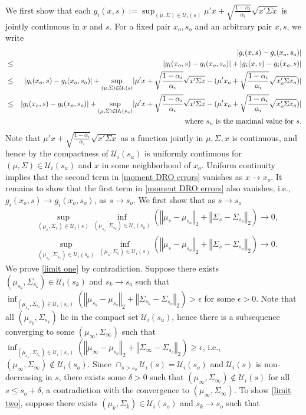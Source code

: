 \documentclass[mnsc,blindrev]{informs4} %
\newcommand{\norm}[1]{\left \Vert #1 \right\Vert}
\begin{document}
We first show that each $g_i(x,s):=\sup_{(\mu,\Sigma)\in \mathcal U_i(s)}\mu'x+\sqrt{\frac{1-\alpha_i}{\alpha_i}}\sqrt{x'\Sigma x}$ is jointly continuous in $x$ and $s$. For a fixed pair $x_o,s_o$ and an arbitrary pair $x,s$, we write
\begin{eqnarray}
\notag&&\lvert g_i(x,s)-g_i(x_o,s_o)\rvert\\
\notag&\leq &\lvert g_i(x_o,s)-g_i(x_o,s_o)\rvert+\lvert g_i(x,s)-g_i(x_o,s)\rvert\\
\notag&\leq&\lvert g_i(x_o,s)-g_i(x_o,s_o)\rvert+\sup_{(\mu,\Sigma)\in \mathcal U_i(s)}\lvert \mu'x+\sqrt{\frac{1-\alpha_i}{\alpha_i}}\sqrt{x'\Sigma x}-(\mu'x_o+\sqrt{\frac{1-\alpha_i}{\alpha_i}}\sqrt{x_o'\Sigma x_o})\rvert\\
\notag&\leq&\lvert g_i(x_o,s)-g_i(x_o,s_o)\rvert+\sup_{(\mu,\Sigma)\in \mathcal U_i(s_u)}\lvert \mu'x+\sqrt{\frac{1-\alpha_i}{\alpha_i}}\sqrt{x'\Sigma x}-(\mu'x_o+\sqrt{\frac{1-\alpha_i}{\alpha_i}}\sqrt{x_o'\Sigma x_o})\rvert\\
&&\text{\ \ where $s_u$ is the maximal value for $s$}.\label{moment DRO errors}
\end{eqnarray}
Note that $\mu'x+\sqrt{\frac{1-\alpha_i}{\alpha_i}}\sqrt{x'\Sigma x}$ as a function jointly in $\mu,\Sigma,x$ is continuous, and hence by the compactness of $\mathcal U_i(s_u)$ is uniformly continuous for $(\mu,\Sigma)\in \mathcal U_i(s_u)$ and $x$ in some neighborhood of $x_o$. Uniform continuity implies that the second term in \eqref{moment DRO errors} vanishes as $x\to x_o$. It remains to show that the first term in \eqref{moment DRO errors} also vanishes, i.e., $g_i(x_o,s) \to g_i(x_o,s_o)$, as $s\to s_o$. We first show that as $s\to s_o$
\begin{align}
&\sup_{(\mu_s,\Sigma_s)\in\mathcal U_i(s)}\inf_{(\mu_{s_o},\Sigma_{s_o})\in\mathcal U_i(s_o)}(\norm{\mu_s-\mu_{s_o}}_2+\norm{\Sigma_s-\Sigma_{s_o}}_2)\to 0,\label{limit one}\\
&\sup_{(\mu_{s_o},\Sigma_{s_o})\in\mathcal U_i(s_o)}\inf_{(\mu_s,\Sigma_s)\in\mathcal U_i(s)}(\norm{\mu_s-\mu_{s_o}}_2+\norm{\Sigma_s-\Sigma_{s_o}}_2)\to 0.\label{limit two}
\end{align}
We prove \eqref{limit one} by contradiction. Suppose there exists $(\mu_{s_k},\Sigma_{s_k})\in\mathcal U_i(s_k)$ and $s_k\to s_o$ such that $\inf_{(\mu_{s_o},\Sigma_{s_o})\in\mathcal U_i(s_o)}(\norm{\mu_{s_k}-\mu_{s_o}}_2+\norm{\Sigma_{s_k}-\Sigma_{s_o}}_2)>\epsilon$ for some $\epsilon>0$. Note that all $(\mu_{s_k},\Sigma_{s_k})$ lie in the compact set $\mathcal U_i(s_u)$, hence there is a subsequence converging to some $(\mu_{\infty},\Sigma_{\infty})$ such that $\inf_{(\mu_{s_o},\Sigma_{s_o})\in\mathcal U_i(s_o)}(\norm{\mu_{\infty}-\mu_{s_o}}_2+\norm{\Sigma_{\infty}-\Sigma_{s_o}}_2)\geq\epsilon$, i.e., $(\mu_{\infty},\Sigma_{\infty})\notin \mathcal U_i(s_o)$. Since $\cap_{s>s_o}\mathcal U_i(s)=\mathcal U_i(s_o)$ and $\mathcal U_i(s)$ is non-decreasing in $s$, there exists some $\delta>0$ such that $(\mu_{\infty},\Sigma_{\infty})\notin\mathcal U_i(s)$ for all $s\leq s_o+\delta$, a contradiction with the convergence to $(\mu_{\infty},\Sigma_{\infty})$. To show \eqref{limit two}, suppose there exists $(\mu_k,\Sigma_k)\in\mathcal U_i(s_o)$ and $s_k\to s_o$ such that
\end{document}
